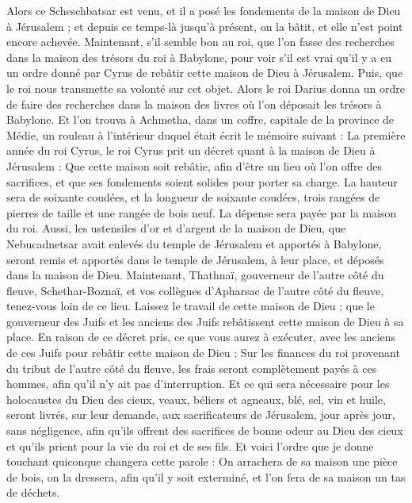 \begin{multicols}{2}
Alors ce Scheschbatsar est venu, et il a posé les fondements de la maison de Dieu à Jérusalem ; et depuis ce temps-là jusqu'à présent, on la bâtit, et elle n'est point encore achevée.
Maintenant, s'il semble bon au roi, que l’on fasse des recherches dans la maison des trésors du roi à Babylone, pour voir s'il est vrai qu'il y a eu un ordre donné par Cyrus de rebâtir cette  maison de Dieu à Jérusalem. Puis, que le roi nous transmette sa volonté sur cet objet.
\VerseOne{}Alors le roi Darius donna un ordre de faire des recherches dans la maison des livres où l'on déposait les  trésors à Babylone.
Et l’on trouva à Achmetha, dans un coffre, capitale de la province de Médie, un rouleau à l’intérieur duquel était écrit  le mémoire suivant :
La première année du roi Cyrus, le roi Cyrus prit un décret quant à la maison de Dieu à Jérusalem : Que cette maison soit rebâtie, afin d’être un lieu où l'on offre des sacrifices, et que ses fondements soient solides pour porter sa charge. La hauteur sera de soixante coudées, et la longueur de soixante coudées,
trois rangées de pierres de taille et une rangée de bois neuf.  La dépense sera payée par la maison du roi.
Aussi, les ustensiles d'or et d'argent de la maison de Dieu, que Nebucadnetsar avait enlevés du temple de Jérusalem et apportés à Babylone, seront remis et apportés dans le temple de Jérusalem, à leur place, et déposés dans la maison de Dieu.
Maintenant, Thathnaï, gouverneur de l'autre côté du fleuve, Schethar-Boznaï, et vos collègues d'Apharsac de l'autre côté du fleuve, tenez-vous loin de ce lieu.
Laissez le travail de cette maison de Dieu ; que le gouverneur des Juifs et les anciens des Juifs rebâtissent cette maison de Dieu à sa place.
En raison de ce décret pris, ce que vous aurez à exécuter, avec les anciens de ces Juifs pour rebâtir cette maison de Dieu : Sur les finances du roi provenant du tribut de l’autre côté du fleuve, les frais seront complètement payés à ces hommes, afin qu'il n'y ait pas d'interruption.
Et ce qui sera nécessaire pour les holocaustes du Dieu des cieux, veaux, béliers et agneaux, blé, sel, vin et huile, seront livrés, sur leur demande, aux sacrificateurs de Jérusalem, jour après jour, sans négligence,
afin qu'ils offrent des sacrifices de bonne odeur au Dieu des cieux et qu'ils prient pour la vie du roi et de ses fils.
Et voici l’ordre que je donne touchant quiconque changera cette parole : On arrachera de sa maison une pièce de bois, on la dressera, afin qu'il y soit exterminé, et l’on fera de sa maison un tas de déchets.

\end{multicols}
